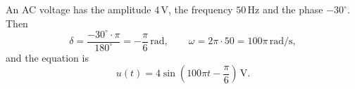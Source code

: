 \begin{exempel}
An AC voltage has the amplitude $4\,\text{V}$, the frequency $50\,\text{Hz}$ and the phase
$-30^{\circ}$. Then
\[
  \delta = \frac{-30^{\circ} \cdot \pi}{180^{\circ}} = -\frac{\pi}{6}\,\text{rad}, \qquad
  \omega = 2\pi \cdot 50 = 100\pi\,\text{rad/s},
\]
and the equation is
\[
  u(t) = 4\sin\left(100\pi t - \frac{\pi}{6}\right)\,\text{V}.
\]
\end{exempel}
